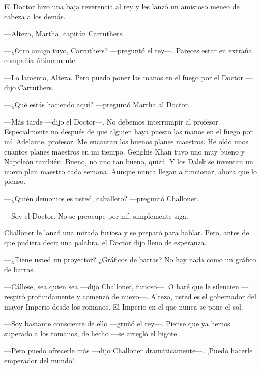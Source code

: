 El Doctor hizo una baja reverencia al rey y les lanzó un amistoso meneo
de cabeza a los demás.

---Alteza, Martha, capitán Carruthers.

---¿Otro amigo tuyo, Carruthers? ---preguntó el rey---. Pareces estar en
extraña compañía últimamente.

---Lo lamento, Alteza. Pero puedo poner las manos en el fuego por el
Doctor ---dijo Carruthers.

---¿Qué estás haciendo aquí? ---preguntó Martha al Doctor.

---Más tarde ---dijo el Doctor---. No debemos interrumpir al profesor.
Especialmente no después de que alguien haya puesto las manos en el
fuego por mí. Adelante, profesor. Me encantan los buenos planes
maestros. He oído unos cuantos planes maestros en mi tiempo. Genghis
Khan tuvo uno muy bueno y Napoleón también. Bueno, no uno tan bueno,
quizá. Y los Dalek se inventan un nuevo plan maestro cada semana. Aunque
nunca llegan a funcionar, ahora que lo pienso.

---¿Quién demonios es usted, caballero? ---preguntó Challoner.

---Soy el Doctor. No se preocupe por mí, simplemente siga.

Challoner le lanzó una mirada furiosa y se preparó para hablar. Pero,
antes de que pudiera decir una palabra, el Doctor dijo lleno de
esperanza.

---¿Tiene usted un proyector? ¿Gráficos de barras? No hay nada como un
gráfico de barras.

---Cállese, sea quien sea ---dijo Challoner, furioso---. O haré que le
silencien ---respiró profundamente y comenzó de nuevo---. Alteza, usted
es el gobernador del mayor Imperio desde los romanos. El Imperio en el
que nunca se pone el sol.

---Soy bastante consciente de ello ---gruñó el rey---. Piense que ya
hemos superado a los romanos, de hecho ---se arregló el bigote.

---Pero puedo ofrecerle más ---dijo Challoner dramáticamente---. ¡Puedo
hacerle emperador del mundo!
